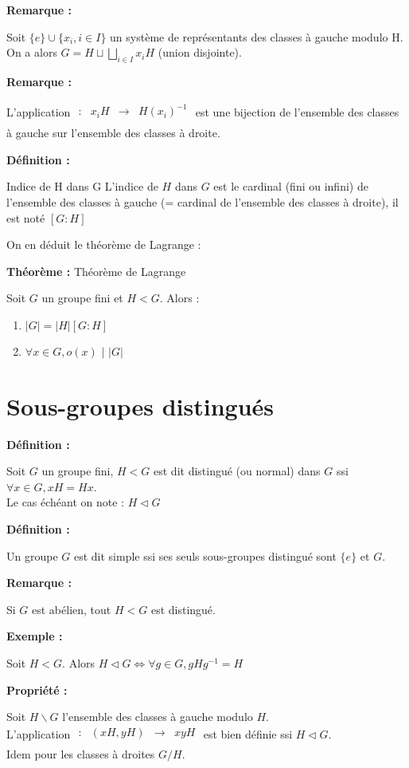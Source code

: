\documentclass{report}
\newenvironment{definition}[1][]{
    \begin{tcolorbox}[colframe= white]
    \textbf{Définition :} 
    #1 \par
    }
    {\end{tcolorbox}}
\newenvironment{prop}{\begin{tcolorbox}[colframe= white]
    \textbf{Propriété :}
     \par}
    {\end{tcolorbox}}
\newenvironment{exemple}{\begin{tcolorbox}[colframe= white]
    \textbf{Exemple :}
     \par}
    {\end{tcolorbox}}
\newenvironment{theoreme}[1][]{
    \begin{tcolorbox}[]
    \textbf{Théorème :} #1  \par} 
    {\end{tcolorbox}}
\newcommand{\remarque}{
    \noindent\textbf{Remarque :} \par
}
\newcommand{\fctsarg}[3]{
    \begin{array}{lrcl}
    #1: & #2 & \longrightarrow & #3 \\
    \end{array}
}
\begin{document}
\remarque 
Soit $\{e\}\cup\{x_i,i\in I\}$ un système de représentants des classes à gauche modulo H. On a alors $G = H \sqcup \displaystyle\bigsqcup_{i \in I} x_i H$ (union disjointe).

\remarque
L'application $\fctsarg{}{x_i H}{H (x_i)^{-1}}$ est une bijection de l'ensemble des classes à gauche sur l'ensemble des classes à droite.

\begin{definition}{Indice de H dans G}
    L'indice de $H$ dans $G$ est le cardinal (fini ou infini) de l'ensemble des classes à gauche (= cardinal de l'ensemble des classes à droite), il est noté $[G:H]$
\end{definition}

On en déduit le théorème de Lagrange :
\begin{theoreme}[Théorème de Lagrange]
    Soit $G$ un groupe fini et $H < G$. Alors :
    \begin{enumerate}
        \item $|G| = |H|[G:H]$
        \item $\forall x \in G, o(x)$ $|$ $|G|$
    \end{enumerate}
\end{theoreme}

\section{Sous-groupes distingués}

\begin{definition}
    Soit $G$ un groupe fini, $H < G$ est dit distingué (ou normal) dans $G$ ssi $\forall x \in G, xH = Hx$.\\
    Le cas échéant on note : $H \triangleleft G$
\end{definition}

\begin{definition}
    Un groupe $G$ est dit simple ssi ses seuls sous-groupes distingué sont $\{e\}$ et $G$.
\end{definition}

\remarque
Si $G$ est abélien, tout $H < G$ est distingué.

\begin{exemple}
    Soit $H < G$. Alors $H \triangleleft G \iff \forall g \in G, gHg^{-1} = H$
\end{exemple}

\begin{prop}
    Soit $H\backslash G$ l'ensemble des classes à gauche modulo $H$.\\
    L'application $\fctsarg{}{(xH,yH)}{xyH}$ est bien définie ssi $H \triangleleft G$.\\
    Idem pour les classes à droites $G/H$.
\end{prop}
\end{document}
